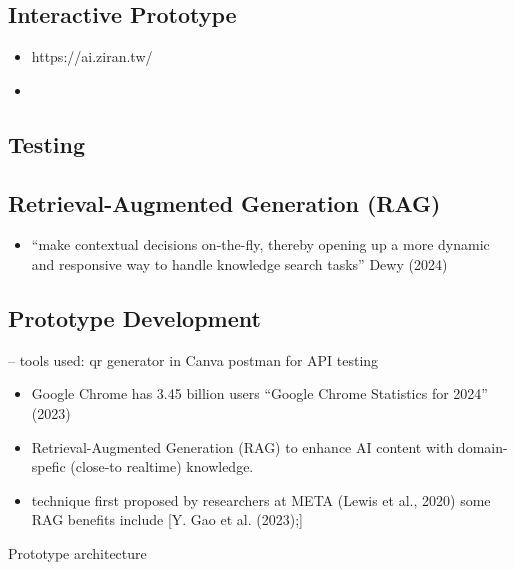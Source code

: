 \documentclass[
  letterpaper,
  DIV=11,
  numbers=noendperiod]{scrartcl}
\providecommand{\tightlist}{%
  \setlength{\itemsep}{0pt}\setlength{\parskip}{0pt}}\usepackage{longtable,booktabs,array}
\begin{document}
\newpage

\subsection{Interactive Prototype}\label{interactive-prototype}

\begin{itemize}
\tightlist
\item
  https://ai.ziran.tw/
\item
\end{itemize}

\subsection{Testing}\label{testing}

\subsection{Retrieval-Augmented Generation
(RAG)}\label{retrieval-augmented-generation-rag}

\begin{itemize}
\tightlist
\item
  ``make contextual decisions on-the-fly, thereby opening up a more
  dynamic and responsive way to handle knowledge search tasks'' Dewy
  (2024)
\end{itemize}

\subsection{Prototype Development}\label{prototype-development}

-- tools used: qr generator in Canva postman for API testing

\begin{itemize}
\item
  Google Chrome has 3.45 billion users {``Google {Chrome Statistics} for
  2024''} (2023)
\item
  Retrieval-Augmented Generation (RAG) to enhance AI content with
  domain-spefic (close-to realtime) knowledge.
\item
  technique first proposed by researchers at META (Lewis et al., 2020)
  some RAG benefits include {[}Y. Gao et al. (2023);{]}
\end{itemize}

Prototype architecture
\end{document}
